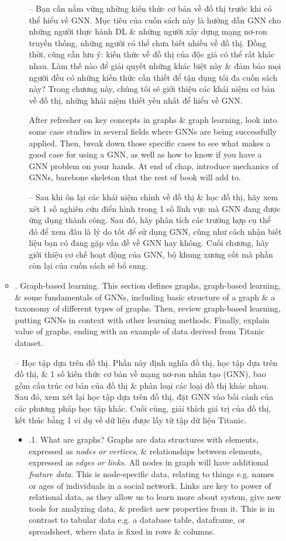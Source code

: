 \documentclass{article}
\begin{document}
\begin{itemize}
\begin{itemize}
\begin{itemize}
            -- Bạn cần nắm vững những kiến thức cơ bản về đồ thị trước khi có thể hiểu về GNN. Mục tiêu của cuốn sách này là hướng dẫn GNN cho những người thực hành DL \& những người xây dựng mạng nơ-ron truyền thống, những người có thể chưa biết nhiều về đồ thị. Đồng thời, cũng cần lưu ý: kiến thức về đồ thị của độc giả có thể rất khác nhau. Làm thế nào để giải quyết những khác biệt này \& đảm bảo mọi người đều có những kiến thức cần thiết để tận dụng tối đa cuốn sách này? Trong chương này, chúng tôi sẽ giới thiệu các khái niệm cơ bản về đồ thị, những khái niệm thiết yếu nhất để hiểu về GNN.

            After refresher on key concepts in graphs \& graph learning, look into some case studies in several fields where GNNs are being successfully applied. Then, break down those specific cases to see what makes a good case for using a GNN, as well as how to know if you have a GNN problem on your hands. At end of chap, introduce mechanics of GNNs, barebone skeleton that the rest of book will add to.

            -- Sau khi ôn lại các khái niệm chính về đồ thị \& học đồ thị, hãy xem xét 1 số nghiên cứu điển hình trong 1 số lĩnh vực mà GNN đang được ứng dụng thành công. Sau đó, hãy phân tích các trường hợp cụ thể đó để xem đâu là lý do tốt để sử dụng GNN, cũng như cách nhận biết liệu bạn có đang gặp vấn đề về GNN hay không. Cuối chương, hãy giới thiệu cơ chế hoạt động của GNN, bộ khung xương cốt mà phần còn lại của cuốn sách sẽ bổ sung.
        \end{itemize}
        \item {. Graph-based learning.} This section defines graphs, graph-based learning, \& some fundamentals of GNNs, including basic structure of a graph \& a taxonomy of different types of graphs. Then, review graph-based learning, putting GNNs in context with other learning methods. Finally, explain value of graphs, ending with an example of data derived from Titanic dataset.

        -- Học tập dựa trên đồ thị. Phần này định nghĩa đồ thị, học tập dựa trên đồ thị, \& 1 số kiến thức cơ bản về mạng nơ-ron nhân tạo (GNN), bao gồm cấu trúc cơ bản của đồ thị \& phân loại các loại đồ thị khác nhau. Sau đó, xem xét lại học tập dựa trên đồ thị, đặt GNN vào bối cảnh của các phương pháp học tập khác. Cuối cùng, giải thích giá trị của đồ thị, kết thúc bằng 1 ví dụ về dữ liệu được lấy từ tập dữ liệu Titanic.
        \begin{itemize}
            \item {.1. What are graphs?} Graphs are data structures with elements, expressed as {\it nodes or vertices}, \& relationships between elements, expressed as {\it edges or links}. All nodes in graph will have additional {\it feature data}. This is node-specific data, relating to things e.g. names or ages of individuals in a social network. Links are key to power of relational data, as they allow us to learn more about system, give new tools for analyzing data, \& predict new properties from it. This is in contrast to tabular data e.g. a database table, dataframe, or spreadsheet, where data is fixed in rows \& columns.


\end{itemize}
\end{itemize}
\end{itemize}
\end{document}
